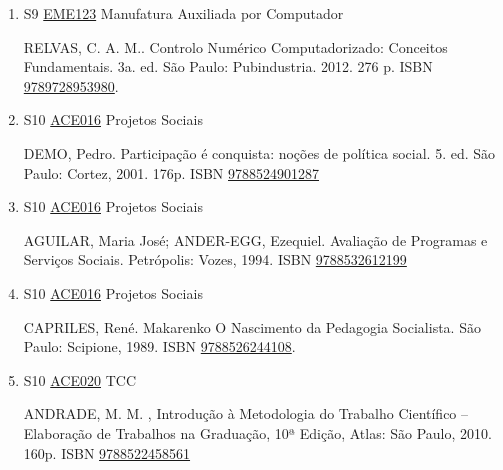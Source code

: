 \documentclass[12pt,a4paper]{book}
\begin{document}
\begin{enumerate}
 TRAUBOMATI.   Comando Numérico Computadorizado.  1a.  ed.  Vol.  2.  São Paulo: EPU.  1985, 256 p.  ISBN \href{http://www.bn.br/site/pages/servicosProfissionais/agenciaISBN/isbnBusca/FbnBuscaISBNCatalogo.asp?pField=ISBN&pIntPagina=1&pISBN=12180304&nidbISBN=true&hidbISBN=true}{9788512180304}
 
 
 \item S9 \hyperref[PUD:EME123]{EME123} Manufatura Auxiliada por Computador

 RELVAS, C.  A.  M..  Controlo Numérico Computadorizado: Conceitos Fundamentais.  3a.  ed.  São Paulo: Pubindustria.  2012.  276 p.  ISBN \href{http://www.google.com/search?hl=pt-BR&tbo=p&tbm=bks&q=isbn:9789728953980&num=10}{9789728953980}.
 \item S10 \hyperref[PUD:ACE016]{ACE016} Projetos Sociais

  DEMO, Pedro.  Participação é conquista: noções de política social.  5. ed.  São Paulo: Cortez, 2001.  176p.  ISBN \href{http://www.bn.br/site/pages/servicosProfissionais/agenciaISBN/isbnBusca/FbnBuscaISBNCatalogo.asp?pField=ISBN&pIntPagina=1&pISBN=24901287&nidbISBN=true&hidbISBN=true}{9788524901287}
 
 
 \item S10 \hyperref[PUD:ACE016]{ACE016} Projetos Sociais

  AGUILAR, Maria José;  ANDER-EGG, Ezequiel.  Avaliação de Programas e Serviços Sociais.  Petrópolis: Vozes, 1994.  ISBN \href{http://www.bn.br/site/pages/servicosProfissionais/agenciaISBN/isbnBusca/FbnBuscaISBNCatalogo.asp?pField=ISBN&pIntPagina=1&pISBN=32612199&nidbISBN=true&hidbISBN=true}{9788532612199}
 
 
 \item S10 \hyperref[PUD:ACE016]{ACE016} Projetos Sociais

  CAPRILES, René.  Makarenko O Nascimento da Pedagogia Socialista.  São Paulo: Scipione, 1989.  ISBN \href{http://www.bn.br/site/pages/servicosProfissionais/agenciaISBN/isbnBusca/FbnBuscaISBNCatalogo.asp?pField=ISBN&pIntPagina=1&pISBN=26244108&nidbISBN=true&hidbISBN=true}{9788526244108}.
 \item S10 \hyperref[PUD:ACE020]{ACE020} TCC

 ANDRADE, M.  M. , Introdução à Metodologia do Trabalho Científico – Elaboração de Trabalhos na Graduação, 10ª Edição, Atlas: São Paulo, 2010.  160p.  ISBN \href{http://www.bn.br/site/pages/servicosProfissionais/agenciaISBN/isbnBusca/FbnBuscaISBNCatalogo.asp?pField=ISBN&pIntPagina=1&pISBN=22458561&nidbISBN=true&hidbISBN=true}{9788522458561}
 

\end{enumerate}
\end{document}
